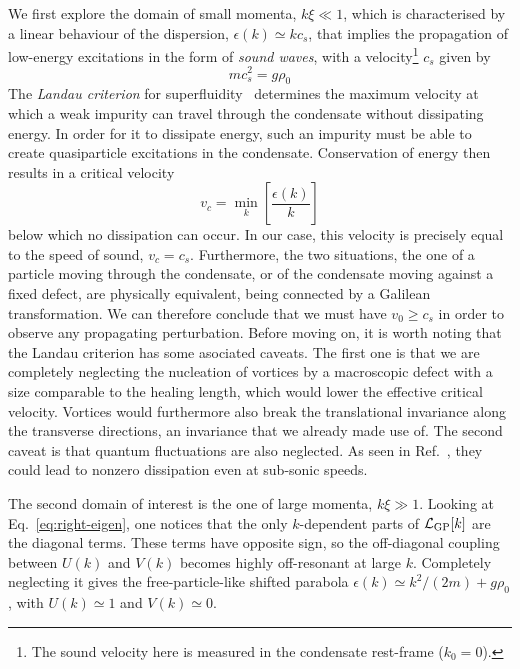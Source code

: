 We first explore the domain of small momenta, $k\xi \ll 1$, which is
characterised by a linear behaviour of the dispersion,
$\epsilon(k) \simeq k c_s$, that implies the propagation of low-energy
excitations in the form of \textit{sound waves}, with a
velocity\footnote{The sound velocity here is measured in the
  condensate rest-frame ($k_0 = 0$).} $c_s$ given by
%
\begin{equation}\label{eq:sound-velocity}
  mc^2_s = g \rho_0
\end{equation}
% 
The \textit{Landau criterion} for superfluidity~\cite{9780198507192}
determines the maximum velocity at which a weak impurity can travel
through the condensate without dissipating energy. In order for it to
dissipate energy, such an impurity must be able to create
quasiparticle excitations in the condensate. Conservation of energy
then results in a critical velocity
%
\begin{equation}\label{eq:Landau}
  v_c=\min_{k} \left[\frac{\epsilon(k)}{k}\right]
\end{equation}
% 
below which no dissipation can occur. In our case, this velocity is
precisely equal to the speed of sound, $v_c =
c_s$. Furthermore, the two situations, the one of a particle moving
through the condensate, or of the condensate moving against a fixed
defect, are physically equivalent, being connected by a Galilean
transformation. We can therefore conclude that we must have
$v_0 \geq c_s$ in order to observe any propagating
perturbation. Before moving on, it is worth noting that the Landau
criterion has some asociated caveats. The first one is that we are
completely neglecting the nucleation of vortices by a macroscopic
defect with a size comparable to the healing length, which would lower
the effective critical velocity. Vortices would furthermore also break
the translational invariance along the transverse directions, an
invariance that we already made use of. The second caveat is that
quantum fluctuations are also neglected. As seen in
Ref.~\cite{Astrakharchik_2004}, they could lead to nonzero dissipation
even at sub-sonic speeds.

The second domain of interest is the one of large momenta,
$k\xi \gg 1$. Looking at Eq.~\eqref{eq:right-eigen}, one notices that
the only $k$-dependent parts of $\mathcal{L}_{\text{GP}} [k]$ are the
diagonal terms. These terms have opposite sign, so the off-diagonal
coupling between $U(k)$ and $V(k)$ becomes highly off-resonant at
large $k$. Completely neglecting it gives the free-particle-like
shifted parabola $\epsilon(k) \simeq k^2/(2m)+g\rho_0$, with
$U(k) \simeq 1$ and $V(k) \simeq 0$.

